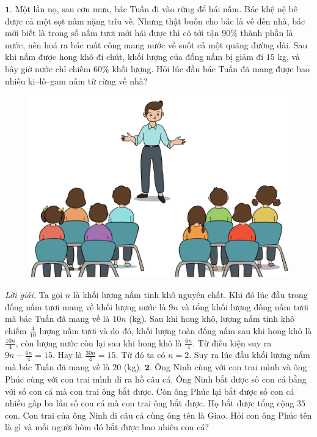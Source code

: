 \begin{multicols}{2}
	$\pmb{1.}$ Một lần nọ, sau cơn mưa, bác Tuấn đi vào rừng để hái nấm. Bác khệ nệ bê được cả một sọt nấm nặng trĩu về. Nhưng thật buồn cho bác là về đến nhà, bác mới biết là trong số nấm tươi mới hái được thì có tới tận $90\%$ thành phần là nước, nên hoá ra bác mất công mang nước về suốt cả một quãng đường dài. Sau khi nấm được hong khô đi chút, khối lượng của đống nấm bị giảm đi $15$ kg, và bây giờ nước chỉ chiếm $60\%$ khối lượng. Hỏi lúc đầu bác Tuấn đã mang được bao nhiêu ki--lô--gam nấm từ rừng về nhà?
	\begin{figure}[H]
		\centering
		\vspace*{-10pt}
		\captionsetup{labelformat= empty, justification=centering}
		\includegraphics[width=0.4\linewidth]{bai1}
		\vspace*{-10pt}
	\end{figure}
	\textit{Lời giải.} 	Ta gọi $n$ là khối lượng nấm tinh khô nguyên chất. Khi đó lúc đầu trong đống nấm tươi mang về khối lượng nước là $9n$ và tổng khối lượng đống nấm tươi mà bác Tuấn đã mang về là $10n$ (kg). Sau khi hong khô, lượng nấm tinh khô chiếm $\frac{4}{10}$ lượng nấm tươi và do đó, khối lượng toàn đống nấm sau khi hong khô là $\frac{10n}{4}$, còn lượng nước còn lại sau khi hong khô là $\frac{6n}{4}$.
	\vskip 0.1cm
	Từ điều kiện suy ra $9n-\frac{6n}{4} =15$. Hay là $\frac{30n}{4}=15$. Từ đó ta có $n=2$. Suy ra lúc đầu khối lượng nấm mà bác Tuấn đã mang về là $20$ (kg).
	\vskip 0.1cm
	$\pmb{2.}$ Ông Ninh cùng với con trai mình và ông Phúc cùng với con trai mình đi ra hồ câu cá. Ông Ninh bắt được số con cá bằng với số con cá mà con trai ông  bắt được. Còn ông Phúc lại bắt được số con cá nhiều gấp ba lần số con cá mà con trai ông bắt được. Họ bắt được tổng cộng  $35$ con. Con trai của ông Ninh đi câu cá cùng ông tên là Giao. Hỏi con ông Phúc tên là gì và mỗi người hôm đó bắt được bao nhiêu con cá?
	\begin{figure}[H]
		\centering
		\vspace*{-15pt}
		\captionsetup{labelformat= empty, justification=centering}

\end{figure}
\end{multicols}
